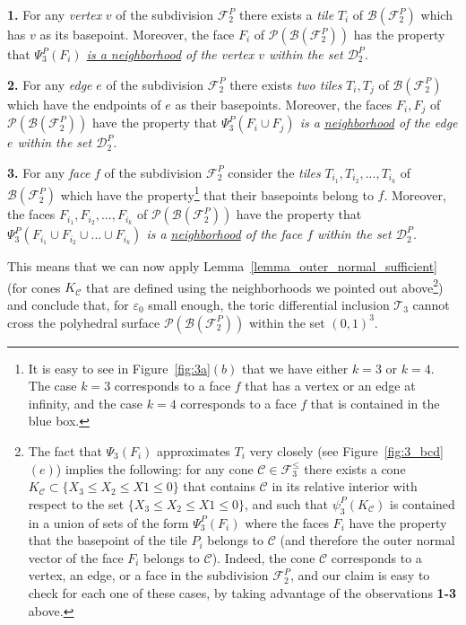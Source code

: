 \documentclass[12pt,letterpaper]{article}
\newcommand{\C}{\mathcal{C}}
\newcommand{\T}{\mathcal{T}}
\renewcommand{\P}{\mathcal{P}}
\newcommand{\B}{\mathcal{B}}
\newcommand{\D}{\mathcal{D}}
\newcommand{\F}{\mathcal{F}}
\newcommand{\eps}{\varepsilon}
\begin{document}
\smallskip
  
\noindent
{\bf 1.} For any {\em vertex} $v$ of the subdivision $\F_2^P$ there exists a {\em tile} $T_i$ of $\B(\F_2^P)$ which has $v$ as its basepoint. Moreover, the face $F_i$ of $\P(\B(\mathcal{F}_2^P))$ has the property that {\em $\Psi_3^P(F_i)$ \underline{is a neighborhood} of the vertex $v$ within the set $\D_2^P$}. 

\smallskip

\noindent
{\bf 2.}  For any {\em edge} $e$ of the subdivision $\F_2^P$ there exists {\em two tiles} $T_i, T_j$ of $\B(\F_2^P)$ which have the endpoints of $e$ as their basepoints. Moreover, the faces $F_i, F_j$ of $\P(\B(\mathcal{F}_2^P))$ have the property that {\em $\Psi_3^P(F_i \cup F_j)$ is a \underline{neighborhood} of the edge $e$ within the set $\D_2^P$}. 

\smallskip


\noindent
{\bf 3.}  For any {\em face} $f$ of the subdivision $\F_2^P$ consider the {\em tiles} $T_{i_1}, T_{i_2},  ..., T_{i_k}$ of $\B(\F_2^P)$ which have the property\footnote{It is easy to see in Figure~\ref{fig:3a}$(b)$ that we have either $k=3$ or $k=4$. The case $k=3$ corresponds to a face $f$ that has a vertex or an edge at infinity, and the case $k=4$ corresponds to a face $f$ that is contained in the blue box.} that their basepoints belong to $f$. Moreover, the faces $F_{i_1}, F_{i_2},  ..., F_{i_k}$ of $\P(\B(\mathcal{F}_2^P))$ have the property that {\em $\Psi_3^P(F_{i_1} \cup F_{i_2} \cup ... \cup F_{i_k})$ is a \underline{neighborhood} of the face $f$ within the set $\D_2^P$}. 


\smallskip


This means that we can now apply  Lemma~\ref{lemma_outer_normal_sufficient} (for cones $K_\C$ that are defined using the neighborhoods we pointed out above\footnote{The fact that $\Psi_3(F_i)$ approximates $T_i$ very closely (see Figure~\ref{fig:3_bcd}$(e)$) implies the following: for any cone $\C \in \F_3^\le$ there exists a  cone $K_\C \subset \{ X_3 \le X_2 \le X1 \le 0 \}$ that contains  $\C$ in its relative interior with respect to the set $\{ X_3 \le X_2 \le X1 \le 0 \}$, and such that $\psi_3^P(K_\C)$ is contained in a union of sets of the form $\Psi_3^P(F_i)$  where the faces $F_i$ have the property that the basepoint of the tile $P_i$ belongs to $\C$ (and therefore the outer normal vector of the face $F_i$ belongs to $\C$). Indeed, the cone $\C$ corresponds to a vertex, an edge, or a face in the subdivision $\F_2^P$, and our claim is easy to check for each one of these cases, by taking advantage of the observations {\bf 1-3} above. }) and conclude that, for $\eps_0$ small enough, the toric differential inclusion $\T_3$ cannot cross the polyhedral surface $\P(\B(\mathcal{F}_2^P))$ within the set $(0,1)^3$. 
\end{document}
